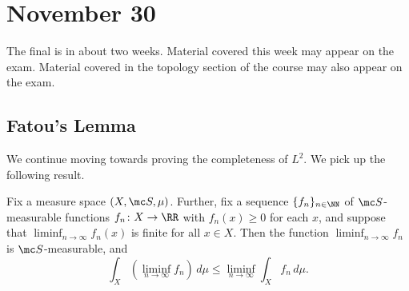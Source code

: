 \documentclass[../notes.tex]{subfiles}
\begin{document}
\section{November 30}

The final is in about two weeks. Material covered this week may appear on the exam. Material covered in the topology section of the course may also appear on the exam.

\subsection{Fatou's Lemma}
We continue moving towards proving the completeness of $L^2$. We pick up the following result.
\begin{lemma}[Fatou] \label{lem:fatou}
	Fix a measure space $(X,\mc S,\mu)$. Further, fix a sequence $\{f_n\}_{n\in\NN}$ of $\mc S$-measurable functions $f_n\colon X\to\RR$ with $f_n(x)\ge0$ for each $x$, and suppose that $\liminf_{n\to\infty}f_n(x)$ is finite for all $x\in X$. Then the function $\liminf_{n\to\infty}f_n$ is $\mc S$-measurable, and
	\[\int_X\left(\liminf_{n\to\infty} f_n\right)\,d\mu\le\liminf_{n\to\infty}\int_Xf_n\,d\mu.\]
\end{lemma}
\end{document}
